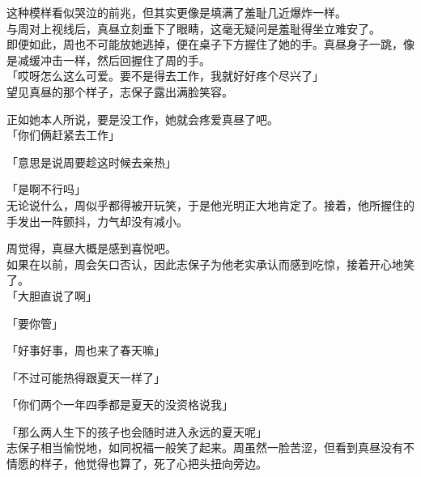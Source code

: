 这种模样看似哭泣的前兆，但其实更像是填满了羞耻几近爆炸一样。\\

与周对上视线后，真昼立刻垂下了眼睛，这毫无疑问是羞耻得坐立难安了。\\

即便如此，周也不可能放她逃掉，便在桌子下方握住了她的手。真昼身子一跳，像是减缓冲击一样，然后回握住了周的手。\\

「哎呀怎么这么可爱。要不是得去工作，我就好好疼个尽兴了」\\

望见真昼的那个样子，志保子露出满脸笑容。

正如她本人所说，要是没工作，她就会疼爱真昼了吧。\\

「你们俩赶紧去工作」

「意思是说周要趁这时候去亲热」

「是啊不行吗」\\

无论说什么，周似乎都得被开玩笑，于是他光明正大地肯定了。接着，他所握住的手发出一阵颤抖，力气却没有减小。

周觉得，真昼大概是感到喜悦吧。\\

如果在以前，周会矢口否认，因此志保子为他老实承认而感到吃惊，接着开心地笑了。\\

「大胆直说了啊」

「要你管」

「好事好事，周也来了春天嘛」

「不过可能热得跟夏天一样了」

「你们两个一年四季都是夏天的没资格说我」

「那么两人生下的孩子也会随时进入永远的夏天呢」\\

志保子相当愉悦地，如同祝福一般笑了起来。周虽然一脸苦涩，但看到真昼没有不情愿的样子，他觉得也算了，死了心把头扭向旁边。
